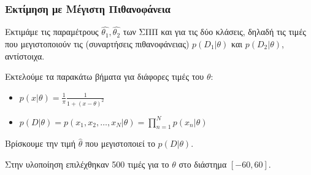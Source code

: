 \documentclass{beamer}
\begin{document}
\begin{frame}
\frametitle{Εκτίμηση με Μέγιστη Πιθανοφάνεια}

Εκτιμάμε τις παραμέτρους $\hat{\theta_1}, \hat{\theta_2}$ των ΣΠΠ και για τις δύο 
κλάσεις, δηλαδή τις τιμές που μεγιστοποιούν τις (συναρτήσεις πιθανοφάνειας) $p(D_1|\theta)$ και $p(D_2|\theta)$,
αντίστοιχα.

Εκτελούμε τα παρακάτω βήματα για διάφορες τιμές του $\theta$:

\begin{itemize}
    \item $p(x|\theta) = \frac{1}{\pi} \frac{1}{1+(x-\theta)^2}$
    \item $p(D|\theta) = p(x_1, x_2, \dots, x_N | \theta) = \prod_{n=1}^N p(x_n | \theta)$
 
\end{itemize}
 
Βρίσκουμε την τιμή $\hat{\theta}$ που μεγιστοποιεί  το $p(D|\theta)$.

Στην υλοποίηση επιλέχθηκαν 500 τιμές για το $\theta$ στο διάστημα $[-60,60]$.


\end{frame}
\end{document}
